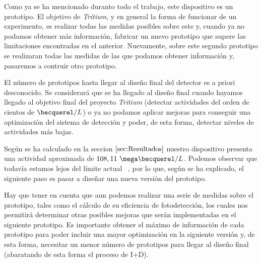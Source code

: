 Como ya se ha mencionado duranto todo el trabajo, este dispositivo es un prototipo. El objetivo de \textit{Tritium}, y en general la forma de funcionar de un experimento, es realizar todas las medidas posibles sobre este y, cuando ya no podamos obtener más información, fabricar un nuevo prototipo que supere las limitaciones encontradas en el anterior. Nuevamente, sobre este segundo prototipo se realizaran todas las medidas de las que podamos obtener información y, pasaremos a contruir otro prototipo.

El número de prototipos hasta llegar al diseño final del detector es a priori desconocido. Se considerará que se ha llegado al diseño final cuando hayamos llegado al objetivo final del proyecto \textit{Tritium} (detectar actividades del orden de cientos de $\becquerel/L$) o ya no podamos aplicar mejoras para conseguir una optimización del sistema de detección y poder, de esta forma, detectar niveles de actividades más bajas.

Según se ha calculado en la seccion $\ref{sec:Resultados}$ nuestro dispositivo presenta una actividad aproximada de $108,11~\mega\becquerel/L$. Podemos observar que todavía estamos lejos del límite actual ~\cite{Rat}, por lo que, según se ha explicado, el siguiente paso es pasar a diseñar una nueva versión del prototipo. 

Hay que tener en cuenta que aun podemos realizar una serie de medidas sobre el prototipo, tales como el cálculo de su eficiencia de fotodetección, los cuales nos permitirá determinar otras posibles mejoras que serán implementadas en el siguiente prototipo. Es importante obtener el máximo de información de cada prototipo para poder incluir una mayor optimización en la siguiente versión y, de esta forma, necesitar un menor número de prototipos para llegar al diseño final (abaratando de esta forma el proceso de I+D). 

